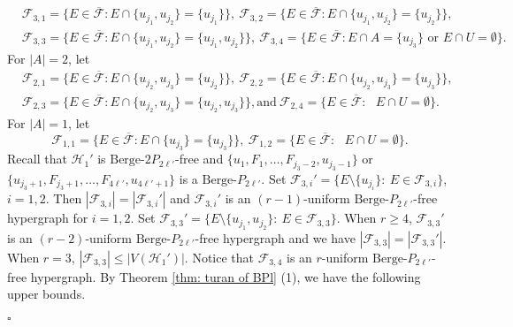 \documentclass[12pt]{article}%
\newenvironment{proof}{{\noindent\it Proof.}}{\hfill $\square$\par}
\newcommand{\ber}{\text{Berge-}}
\newcommand{\mh}{\mathcal{H}}
\begin{document}
\begin{proof}
\begin{equation*}
    \begin{aligned}
        &\mathcal{F}_{3,1}=\{E\in \overline{\mathcal{F}} : E\cap \{u_{j_1},u_{j_2}\}=\{u_{j_1}\}\}
        ,~\mathcal{F}_{3,2}=\{E\in \overline{\mathcal{F}} : E\cap \{u_{j_1},u_{j_2}\} =\{u_{j_2}\}\},\\
        &\mathcal{F}_{3,3}=\{E\in \overline{\mathcal{F}} : E\cap \{u_{j_1},u_{j_2}\}=\{u_{j_1},u_{j_2}\}\},~\mathcal{F}_{3,4}=\{E\in \overline{\mathcal{F}} :  \text{$E\cap A=\{u_{j_3}\}$ or $E\cap U=\emptyset$}\}.
    \end{aligned}
\end{equation*}
For $|A|=2$, let
\begin{equation*}
    \begin{aligned}
        &\mathcal{F}_{2,1}=\{E\in \overline{\mathcal{F}} : E\cap \{u_{j_2},u_{j_3}\}=\{u_{j_2}\}\}
        ,~\mathcal{F}_{2,2}=\{E\in \overline{\mathcal{F}} : E\cap \{u_{j_2},u_{j_3}\} =\{u_{j_3}\}\},\\
        &\mathcal{F}_{2,3}=\{E\in \overline{\mathcal{F}} : E\cap \{u_{j_2},u_{j_3}\}=\{u_{j_2},u_{j_3}\}\},\text{and}~\mathcal{F}_{2,4}=\{E\in \overline{\mathcal{F}} :  \text{ $E\cap U=\emptyset$}\}.
    \end{aligned}
\end{equation*}For $|A|=1$, let
\begin{equation*}
        \mathcal{F}_{1,1}=\{E\in \overline{\mathcal{F}} : E\cap \{u_{j_3}\} =\{u_{j_3}\}\},~\mathcal{F}_{1,2}=\{E\in \overline{\mathcal{F}} :  \text{  $E\cap U=\emptyset$}\}.
\end{equation*}
Recall that $\mh_{1}'$ is $\ber 2P_{2\ell'}$-free and $\{u_1,F_{1},\ldots,F_{j_{3}-2},u_{j_3-1}\}$ or $\{u_{j_3+1},F_{j_3+1},\ldots,F_{4\ell'},u_{4\ell'+1}\}$ is  a $\ber P_{2\ell'}$. Set $\mathcal{F}_{3,i}'=\{E\setminus\{u_{j_i}\}:~E\in \mathcal{F}_{3,i}\}$, $i=1,2$. Then  $|\mathcal{F}_{3,i}|=|\mathcal{F}_{3,i}'|$ and $\mathcal{F}_{3,i}'$ is an $(r-1)$-uniform $\ber P_{2\ell'}$-free hypergraph for $i=1,2$. Set $\mathcal{F}_{3,3}'=\{E\setminus\{u_{j_1},u_{j_2}\}:~E\in \mathcal{F}_{3,3}\}$. When $r\geq 4$, $\mathcal{F}_{3,3}'$ is an $(r-2)$-uniform $\ber P_{2\ell'}$-free hypergraph and we have $|\mathcal{F}_{3,3}|=|\mathcal{F}_{3,3}'|$. When $r=3$, $|\mathcal{F}_{3,3}|\leq |V(\mh_{1}')|$. Notice that $\mathcal{F}_{3,4}$ is an $r$-uniform $\ber P_{2\ell'}$-free hypergraph. By Theorem \ref{thm: turan of BPl} (1), we have  the following upper bounds.
\begin{equation*}
    \begin{aligned}

\end{aligned}
\end{equation*}
\end{proof}
\end{document}
